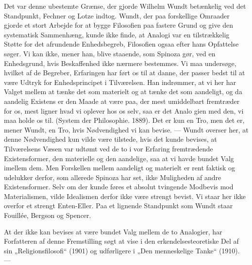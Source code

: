 \documentclass[12pt,a4paper,openany]{book}
\newcommand{\opage}[1]{\marginnote{\footnotesize\textit{[#1]}}}
\begin{document}
Det var denne ubestemte Grænse, der gjorde Wilhelm Wundt betænkelig
ved det Standpunkt, Fechner og Lotze indtog. Wundt, der
paa forskellige Omraader gjorde et stort Arbejde for at bygge Filosofien
paa fastere Grund og give den systematisk Sammenhæng,
kunde ikke finde, at Analogi var en tilstrækkelig Støtte for det afrundende
Enhedsbegreb, Filosofien ogsaa efter hans Opfattelse søger.
Vi kan ikke, mener han, blive staaende, som Spinoza gør, ved
en Enhedsgrund, hvis Beskaffenhed ikke nærmere bestemmes. Vi
maa undersøge, hvilket af de Begreber, Erfaringen har ført os til
at danne, der passer bedst til at være Udtryk for Enhedsprincipet i
Tilværelsen. Han indrømmer, at vi her har Valget mellem at tænke
det som materielt og at tænke det som aandeligt, og da aandelig
Existens er den Maade at være paa, der mest umiddelbart fremtræder
for os, mest ligner hvad vi oplever hos os selv, saa er det Analo%
\opage{65}gien med den, vi maa holde os til. (System der Philosophie. 1889).
Det er kun en Tro, men det er, mener Wundt, en Tro, hvis Nødvendighed
vi kan bevise. --- Wundt overser her, at denne Nødvendighed
kun vilde være tilstede, hvis det kunde bevises, at Tilværelsens
Væsen var udtømt ved de to i vor Erfaring fremtrædende Existensformer,
den materielle og den aandelige, saa at vi havde bundet
Valg imellem dem. Men Forskellen mellem aandeligt og materielt
er rent faktisk og udelukker derfor, som allerede Spinoza har
set, ikke Muligheden af andre Existensformer. Selv om der kunde
føres et absolut tvingende Modbevis mod Materialismen, vilde Idealismen
derfor ikke være strengt bevist. Vi staar her ikke overfor et
strengt Enten-Eller. Paa et lignende Standpunkt som Wundt staar
Fouillée, Bergson og Spencer.

At der ikke kan bevises at være bundet Valg mellem de to Analogier,
har Forfatteren af denne Fremstilling søgt at vise i den erkendelsesteoretiske
Del af sin „Religionsfilosofi“ (1901) og udførligere
i „Den menneskelige Tanke“ (1910). ---
\end{document}
